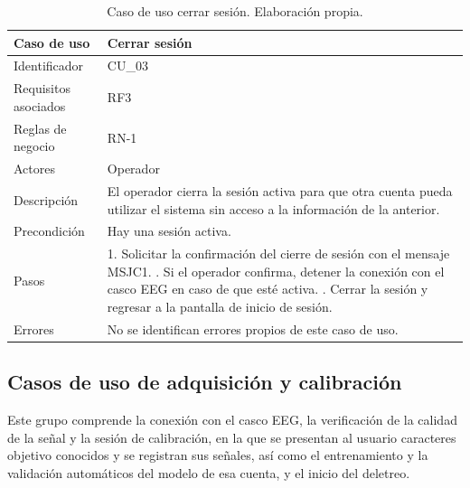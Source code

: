 \begin{table}[H]
\centering
\small
\begin{tabularx}{\textwidth}{|L{3.0cm}|Y|}
\hline
\textbf{Caso de uso} & \textbf{Cerrar sesión} \\
\hline
Identificador & CU\_03 \\
\hline
Requisitos asociados & RF3 \\
\hline
Reglas de negocio & RN-1 \\
\hline
Actores & Operador \\
\hline
Descripción & El operador cierra la sesión activa para que otra cuenta pueda utilizar el sistema sin acceso a la información de la anterior. \\
\hline
Precondición & Hay una sesión activa. \\
\hline
Pasos & 1. Solicitar la confirmación del cierre de sesión con el mensaje MSJC1. . Si el operador confirma, detener la conexión con el casco EEG en caso de que esté activa. . Cerrar la sesión y regresar a la pantalla de inicio de sesión. \\
\hline
Errores & No se identifican errores propios de este caso de uso. \\
\hline
\end{tabularx}
\caption{Caso de uso cerrar sesión. Elaboración propia.}
\label{tab:cu03}
\end{table}


\subsection{Casos de uso de adquisición y calibración}

Este grupo comprende la conexión con el casco EEG, la verificación de la calidad de la señal y la
sesión de calibración, en la que se presentan al usuario caracteres objetivo conocidos y se
registran sus señales, así como el entrenamiento y la validación automáticos del modelo de esa cuenta, y el inicio del deletreo.


